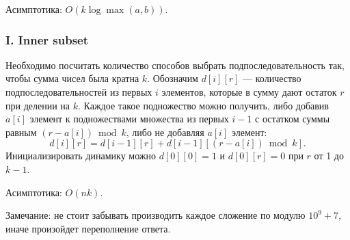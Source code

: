 Асимптотика: $O(k \log \max(a, b))$.



\subsubsection*{I. Inner subset} 


Необходимо посчитать количество способов выбрать подпоследовательность так, чтобы сумма чисел была кратна $k$. Обозначим $d[i][r]$ --- количество подпоследовательностей из первых $i$ элементов, которые в сумму дают остаток $r$ при делении на $k$. Каждое такое подножество можно получить, либо добавив $a[i]$ элемент к подножествами множества из первых $i-1$ с остатком суммы равным $(r - a[i]) \bmod k$, либо не добавляя $a[i]$ элемент:
$$d[i][r] = d[i-1][r] + d[i-1][(r - a[i]) \bmod k].$$
Инициализировать динамику можно $d[0][0] = 1$ и $d[0][r] = 0$ при $r$ от 1 до $k-1$.

Асимптотика: $O(n k)$.

Замечание: не стоит забывать производить каждое сложение по модулю $10^9 + 7$, иначе произойдет переполнение ответа.